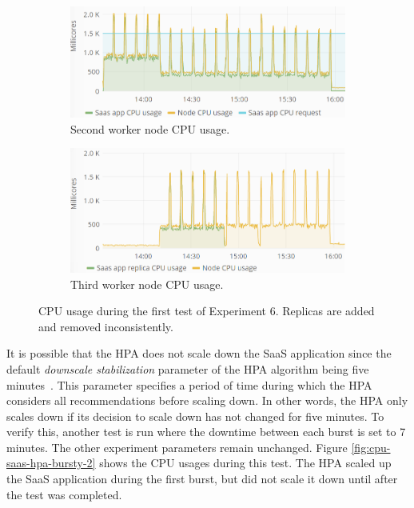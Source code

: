 \begin{figure}
\centering
\begin{subfigure}[b]{\columnwidth}
\centering
\includegraphics[width=0.75\columnwidth]{Images/Experiments/CPU/Grafana/cpu-saas-hpa-bursty-2-1.PNG}
\caption{Second worker node CPU usage.}
\label{fig:cpu-saas-hpa-bursty-2-1}
\end{subfigure}
\hfill
\begin{subfigure}[b]{\columnwidth}
\centering
\includegraphics[width=0.75\columnwidth]{Images/Experiments/CPU/Grafana/cpu-saas-hpa-bursty-2-2.PNG}
\caption{Third worker node CPU usage.}
\label{fig:cpu-saas-hpa-bursty-2-2}
\end{subfigure}
\hfill
\vspace*{-7mm}
\caption{CPU usage during the first test of Experiment 6. Replicas are added and removed inconsistently.}
\label{fig:cpu-saas-hpa-bursty}
\end{figure}


It is possible that the HPA does not scale down the SaaS application since the default \textit{downscale stabilization} parameter of the HPA algorithm being five minutes~\citep{hpa-cooldown-delay}. This parameter specifies a period of time during which the HPA considers all recommendations before scaling down. In other words, the HPA only scales down if its decision to scale down has not changed for five minutes.
To verify this, another test is run where the downtime between each burst is set to 7 minutes. The other experiment parameters remain unchanged. Figure \ref{fig:cpu-saas-hpa-bursty-2} shows the CPU usages during this test. The HPA scaled up the SaaS application during the first burst, but did not scale it down until after the test was completed. 

